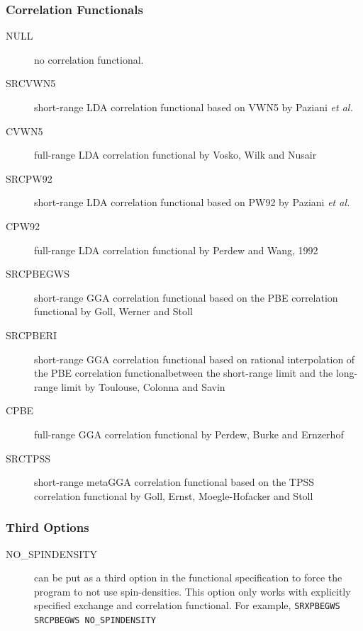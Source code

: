 \subsubsection{Correlation Functionals}
\providecommand\corfn[1]{#1}
\begin{description}

\item[NULL] no correlation functional.

\item[SRCVWN5] short-range LDA correlation functional based on VWN5 by Paziani \textit{et al.}~\cite{srdft:LDAERF}

\item[CVWN5] full-range LDA correlation functional by Vosko, Wilk and Nusair\cite{dft:vwn}

\item[SRCPW92] short-range LDA correlation functional based on PW92 by Paziani \textit{et al.}~\cite{srdft:LDAERF}

\item[CPW92] full-range LDA correlation functional by Perdew and Wang, 1992~\cite{dft:pw91,dft:pw92}

\item[SRCPBEGWS] short-range GGA correlation functional based on the PBE correlation functional by Goll, Werner and Stoll~\cite{srdft:PBEGWSa,srdft:PBEGWSb}

\item[SRCPBERI] short-range GGA correlation functional based on rational interpolation of the PBE correlation functionalbetween the short-range limit and the long-range limit by Toulouse, Colonna and Savin~\cite{srdft:erfgau}

\item[CPBE] full-range GGA correlation functional by Perdew, Burke and Ernzerhof~\cite{dft:pbe}

\item[SRCTPSS] short-range metaGGA correlation functional based on the TPSS correlation functional by Goll, Ernst, Moegle-Hofacker and Stoll~\cite{srdft:srTPSS}

\end{description}
 
\subsubsection{Third Options}
\providecommand\corfn[1]{#1}
\begin{description}

\item[NO\_SPINDENSITY] can be put as a third option in the functional specification to force the program to not use spin-densities. This option only works with explicitly specified exchange and correlation functional. For example, \verb|SRXPBEGWS SRCPBEGWS NO_SPINDENSITY|

\end{description}
\pagebreak[3]

